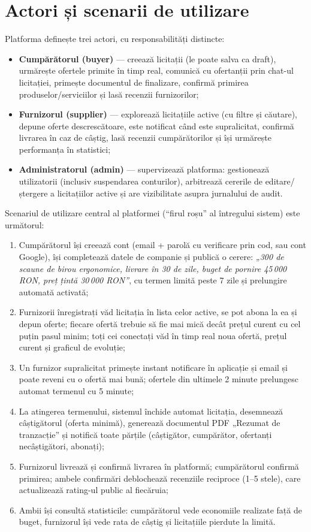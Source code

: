 \section{Actori și scenarii de utilizare}

Platforma definește trei actori, cu responsabilități distincte:

\begin{itemize}
    \item \textbf{Cumpărătorul (buyer)} --- creează licitații (le poate salva ca draft), urmărește ofertele primite în timp real, comunică cu ofertanții prin chat-ul licitației, primește documentul de finalizare, confirmă primirea produselor/serviciilor și lasă recenzii furnizorilor;
    \item \textbf{Furnizorul (supplier)} --- explorează licitațiile active (cu filtre și căutare), depune oferte descrescătoare, este notificat când este supralicitat, confirmă livrarea în caz de câștig, lasă recenzii cumpărătorilor și își urmărește performanța în statistici;
    \item \textbf{Administratorul (admin)} --- supervizează platforma: gestionează utilizatorii (inclusiv suspendarea conturilor), arbitrează cererile de editare/ștergere a licitațiilor active și are vizibilitate asupra jurnalului de audit.
\end{itemize}

Scenariul de utilizare central al platformei (``firul roșu'' al întregului sistem) este următorul:

\begin{enumerate}
    \item Cumpărătorul își creează cont (email + parolă cu verificare prin cod, sau cont Google), își completează datele de companie și publică o cerere: \textit{„300 de scaune de birou ergonomice, livrare în 30 de zile, buget de pornire 45\,000 RON, preț țintă 30\,000 RON''}, cu termen limită peste 7 zile și prelungire automată activată;
    \item Furnizorii înregistrați văd licitația în lista celor active, se pot abona la ea și depun oferte; fiecare ofertă trebuie să fie mai mică decât prețul curent cu cel puțin pasul minim; toți cei conectați văd în timp real noua ofertă, prețul curent și graficul de evoluție;
    \item Un furnizor supralicitat primește instant notificare în aplicație și email și poate reveni cu o ofertă mai bună; ofertele din ultimele 2 minute prelungesc automat termenul cu 5 minute;
    \item La atingerea termenului, sistemul închide automat licitația, desemnează câștigătorul (oferta minimă), generează documentul PDF „Rezumat de tranzacție'' și notifică toate părțile (câștigător, cumpărător, ofertanți necâștigători, abonați);
    \item Furnizorul livrează și confirmă livrarea în platformă; cumpărătorul confirmă primirea; ambele confirmări deblochează recenziile reciproce (1--5 stele), care actualizează rating-ul public al fiecăruia;
    \item Ambii își consultă statisticile: cumpărătorul vede economiile realizate față de buget, furnizorul își vede rata de câștig și licitațiile pierdute la limită.
\end{enumerate}

